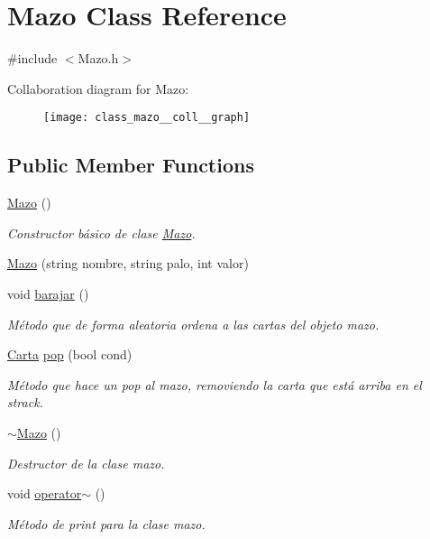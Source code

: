 \hypertarget{class_mazo}{\section{Mazo Class Reference}
\label{class_mazo}
}


{\ttfamily \#include $<$Mazo.\+h$>$}



Collaboration diagram for Mazo\+:
\nopagebreak
\begin{figure}[H]
\begin{center}
\leavevmode
\texttt{[image: class\_mazo\_\_coll\_\_graph]}
\end{center}
\end{figure}
\subsection*{Public Member Functions}
\begin{DoxyCompactItemize}
\item 
\hyperlink{class_mazo_a93eaa35af9ad42840c3a37d4054ba17d}{Mazo} ()
\begin{DoxyCompactList}\small\item\em Constructor básico de clase \hyperlink{class_mazo}{Mazo}. \end{DoxyCompactList}\item 
\hyperlink{class_mazo_afa6b84ca154491f3a3258c306cffdda3}{Mazo} (string nombre, string palo, int valor)
\item 
void \hyperlink{class_mazo_ad73b15de8ae06e4e7aaecd97626bbe21}{barajar} ()
\begin{DoxyCompactList}\small\item\em Método que de forma aleatoria ordena a las cartas del objeto mazo. \end{DoxyCompactList}\item 
\hyperlink{class_carta}{Carta} \hyperlink{class_mazo_a31ede195584d6c9b6046e1a409b95540}{pop} (bool cond)
\begin{DoxyCompactList}\small\item\em Método que hace un pop al mazo, removiendo la carta que está arriba en el strack. \end{DoxyCompactList}\item 
\hyperlink{class_mazo_a2ce07ca90c706e6454ac54d727d3da2a}{$\sim$\+Mazo} ()
\begin{DoxyCompactList}\small\item\em Destructor de la clase mazo. \end{DoxyCompactList}\item 
void \hyperlink{class_mazo_a3d2974fd7edccb74895d66ccb5dc078a}{operator$\sim$} ()
\begin{DoxyCompactList}\small\item\em Método de print para la clase mazo. \end{DoxyCompactList}\end{DoxyCompactItemize}
